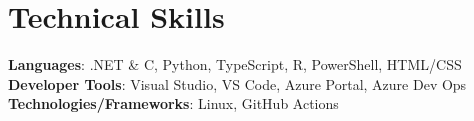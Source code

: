 \documentclass[letterpaper,11pt]{article}
\makeatletter
\newcommand{\resumeItem}[1]{
  \item\small{
    {#1 \vspace{-2pt}}
  }
}
\newcommand{\resumeProjectHeading}[2]{
    \item
    \begin{tabular*}{1.001\textwidth}{l@{\extracolsep{\fill}}r}
      \small#1 & \textbf{\small #2}\\
    \end{tabular*}\vspace{-7pt}
}
\newcommand{\resumeSubHeadingListStart}{\begin{itemize}[leftmargin=0.0in, label={}]}
\newcommand{\resumeSubHeadingListEnd}{\end{itemize}}
\newcommand{\resumeItemListStart}{\begin{itemize}}
\newcommand{\resumeItemListEnd}{\end{itemize}\vspace{-5pt}}
\makeatother
\begin{document}

\section{Technical Skills}
 \begin{itemize}[leftmargin=0.15in, label={}]
    \small{\item{
     \textbf{Languages}{: .NET \& C\musSharp{}, Python, TypeScript, R, PowerShell, HTML/CSS} \\
     \textbf{Developer Tools}{: Visual Studio, VS Code, Azure Portal, Azure Dev Ops} \\
     \textbf{Technologies/Frameworks}{: Linux, GitHub Actions} \\
    }}
 \end{itemize}
\end{document}
